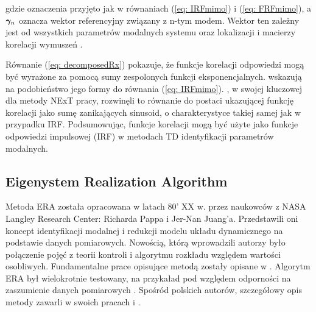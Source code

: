 gdzie oznaczenia przyjęto jak w równaniach (\ref{eq: IRFmimo}) i (\ref{eq: FRFmimo}), a $\bm{\gamma}_n$ oznacza wektor referencyjny związany z n-tym modem. Wektor ten zależny jest od wszystkich parametrów modalnych systemu oraz lokalizacji i macierzy korelacji wymuszeń \parencite{Rainieri2014, Peeters2000}. 

Równanie (\ref{eq: decomposedRx}) pokazuje, że funkcje korelacji odpowiedzi mogą być wyrażone za pomocą sumy zespolonych funkcji eksponencjalnych. \cite{SHEN2003} wskazują na podobieństwo jego formy do równania (\ref{eq: IRFmimo}). \cite{Kennedy1995}, w swojej kluczowej dla metody NExT pracy, rozwinęli to równanie do postaci ukazującej funkcję korelacji jako sumę zanikających sinusoid, o charakterystyce takiej samej jak w przypadku IRF. Podsumowując, funkcje korelacji mogą być użyte jako funkcje odpowiedzi impulsowej (IRF) w metodach TD identyfikacji parametrów modalnych.


\subsection{Eigenystem Realization Algorithm}
Metoda ERA została opracowana w latach 80' XX w. przez naukowców z NASA Langley Research Center: Richarda Pappa i Jer-Nan Juang'a. Przedstawili oni koncept identyfikacji modalnej i redukcji modelu układu dynamicznego na podstawie danych pomiarowych. Nowością, którą wprowadzili autorzy było połączenie pojęć z teorii kontroli i algorytmu rozkładu względem wartości osobliwych. Fundamentalne prace opisujące metodą zostały opisane w \parencite{Pappa1985,Juang1985,Juang1988,Juang1994}. Algorytm ERA był wielokrotnie testowany, na przykaład pod względem odporności na zaszumienie danych pomiarowych \parencite{Juang1986, Li2011}. Spośród polskich autorów, szczegółowy opis metody zawarli w swoich pracach \cite{Szafranski2013} i \cite{Dudek2008}.

